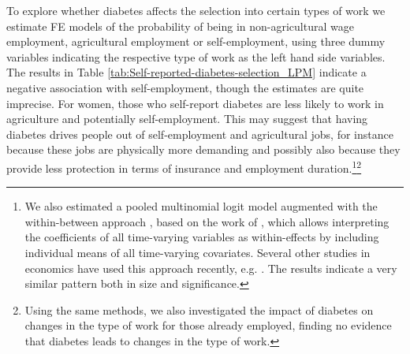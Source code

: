 To explore whether diabetes affects the selection into certain types of work we estimate \ac{FE} models of the probability of being in non-agricultural wage employment, agricultural employment or self-employment, using three dummy variables indicating the respective type of work as the left hand side variables. The results in Table \ref{tab:Self-reported-diabetes-selection_LPM} indicate a negative association with self-employment, though the estimates are quite imprecise. For women, those who self-report diabetes are less likely to work in agriculture and potentially self-employment. This may suggest that having diabetes drives people out of self-employment and agricultural jobs, for instance because these jobs are physically more demanding and possibly also because they provide less protection in terms of insurance and employment duration.\footnote{We also estimated a pooled multinomial logit model augmented  with the within-between approach \parencite{Bell2015}, based on the work of \textcite{Mundlak1978}, which allows interpreting the coefficients of all time-varying variables as within-effects by including individual means of all time-varying covariates. Several other studies in economics have used this approach recently, e.g. \textcite{Geishecker2011,Wunder2014,Boll2016}. The results indicate a very similar pattern both in size and significance.}\footnote{Using the same methods, we also investigated the impact of diabetes on changes in the type of work for those already employed, finding no evidence that diabetes leads to changes in the type of work.}


